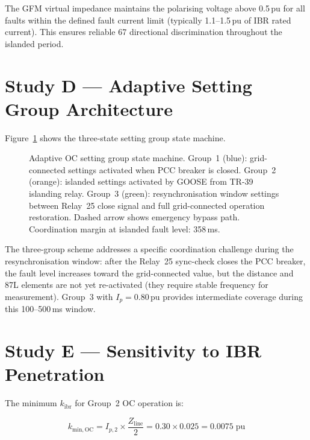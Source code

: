 \documentclass[11pt,a4paper]{article}
\begin{document}
\medskip\noindent
The GFM virtual impedance maintains the polarising voltage above 0.5\,pu for
all faults within the defined fault current limit (typically 1.1--1.5\,pu of
IBR rated current).  This ensures reliable 67 directional discrimination
throughout the islanded period.

\section{Study D --- Adaptive Setting Group Architecture}
\label{sec:studyD}

Figure~\ref{fig:groups} shows the three-state setting group state machine.

\begin{figure}[htbp]
  \centering
  \resizebox{0.94\textwidth}{!}{}
  \caption{Adaptive OC setting group state machine.  Group~1 (blue):
           grid-connected settings activated when PCC breaker is closed.
           Group~2 (orange): islanded settings activated by GOOSE from
           TR-39 islanding relay.  Group~3 (green): resynchronisation
           window settings between Relay~25 close signal and full
           grid-connected operation restoration.  Dashed arrow shows
           emergency bypass path.  Coordination margin at islanded fault
           level: 358\,ms.}
  \label{fig:groups}
\end{figure}

\noindent
The three-group scheme addresses a specific coordination challenge during the
resynchronisation window: after the Relay~25 sync-check closes the PCC breaker,
the fault level increases toward the grid-connected value, but the distance and
87L elements are not yet re-activated (they require stable frequency for
measurement).  Group~3 with $I_{p}=0.80$\,pu provides intermediate coverage
during this 100--500\,ms window.

\section{Study E --- Sensitivity to IBR Penetration}
\label{sec:studyE}

The minimum $k_\mathrm{ibr}$ for Group~2 OC operation is:

\begin{equation}
  k_\mathrm{min,OC} = I_{p,2} \times \frac{Z_\mathrm{line}}{2}
  = 0.30 \times 0.025 = 0.0075\;\mathrm{pu}
\end{equation}
\end{document}
